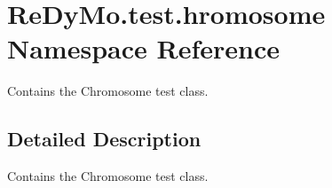 \hypertarget{namespaceReDyMo_1_1test_1_1hromosome}{}\section{Re\+Dy\+Mo.\+test.\+hromosome Namespace Reference}
\label{namespaceReDyMo_1_1test_1_1hromosome}


Contains the Chromosome test class.  




\subsection{Detailed Description}
Contains the Chromosome test class. 